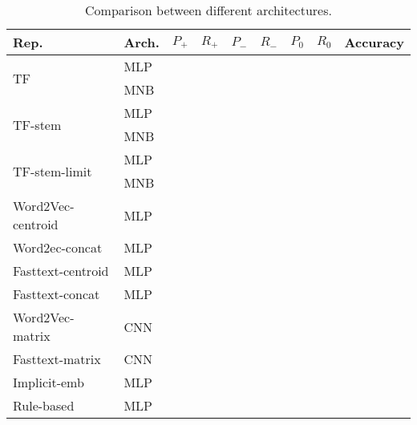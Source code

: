\documentclass[11pt, a4paper]{article}
\begin{document}
\begin{table}[hpt]
	\centering
	\begin{tabular}{lllllllll}
		\hline\hline
		Rep. & Arch. & $ P_+ $ & $ R_+ $ & $ P_- $ & $ R_- $ & $ P_0 $ & $ R_0 $ & Accuracy \\
		\hline
		
		\multirow{2}{*}{TF} & MLP &  &  &  &  &  &  &  \\
		 & MNB &  &  &  &  &  &  &  \\
		
		\multirow{2}{*}{TF-stem} & MLP &  &  &  &  &  &  &  \\
		 & MNB &  &  &  &  &  &  &  \\
		
		\multirow{2}{*}{TF-stem-limit} & MLP &  &  &  &  &  &  &  \\
		 & MNB &  &  &  &  &  &  &  \\
		
		Word2Vec-centroid & MLP  &  &  &  &  &  &  &  \\
		Word2ec-concat & MLP  &  &  &  &  &  &  &  \\
		Fasttext-centroid & MLP  &  &  &  &  &  &  &  \\
		Fasttext-concat & MLP  &  &  &  &  &  &  &  \\
		Word2Vec-matrix & CNN  &  &  &  &  &  &  &  \\
		Fasttext-matrix & CNN  &  &  &  &  &  &  &  \\
		Implicit-emb & MLP  &  &  &  &  &  &  &  \\
		Rule-based & MLP  &  &  &  &  &  &  &  \\
		\hline\hline
	\end{tabular}
	\caption{Comparison between different architectures.}
	\label{tab:comp}
\end{table}
\end{document}
